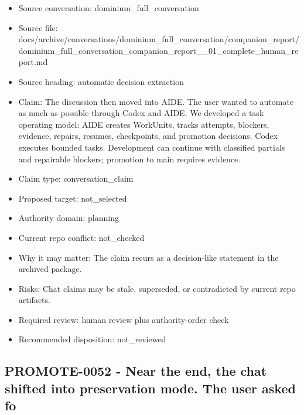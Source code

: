 \documentclass[11pt,a4paper]{report}
\begin{document}
\begin{itemize}
\item Source conversation: dominium\_full\_conversation
\item Source file: docs/archive/conversations/dominium\_full\_conversation/companion\_report/dominium\_full\_conversation\_companion\_report\_\_01\_complete\_human\_report.md
\item Source heading: automatic decision extraction
\item Claim: The discussion then moved into AIDE. The user wanted to automate as much as possible through Codex and AIDE. We developed a task operating model: AIDE creates WorkUnits, tracks attempts, blockers, evidence, repairs, resumes, checkpoints, and promotion decisions. Codex executes bounded tasks. Development can continue with classified partials and repairable blockers; promotion to main requires evidence.
\item Claim type: conversation\_claim
\item Proposed target: not\_selected
\item Authority domain: planning
\item Current repo conflict: not\_checked
\item Why it may matter: The claim recurs as a decision-like statement in the archived package.
\item Risks: Chat claims may be stale, superseded, or contradicted by current repo artifacts.
\item Required review: human review plus authority-order check
\item Recommended disposition: not\_reviewed
\end{itemize}

\subsection{PROMOTE-0052 - Near the end, the chat shifted into preservation mode. The user asked fo}
\end{document}
